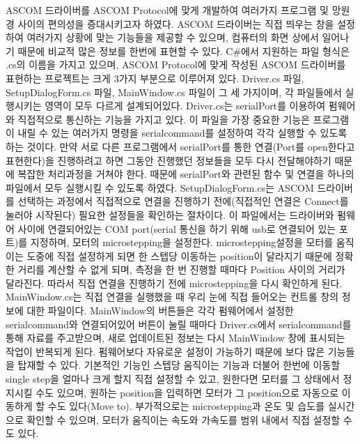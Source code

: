 ASCOM 드라이버를 ASCOM Protocol에 맞게 개발하여 여러가지 프로그램 및 망원경 사이의 편의성을 증대시키고자 하였다. ASCOM 드라이버는 직접 띄우는 창을 설정하여 여러가지 상황에 맞는 기능들을 제공할 수 있으며, 컴퓨터의 화면 상에서 일어나기 때문에 비교적 많은 정보를 한번에 표현할 수 있다.
C#에서 지원하는 파일 형식은 .cs의 이름을 가지고 있으며, ASCOM Protocol에 맞게 작성된 ASCOM 드라이버를 표현하는 프로젝트는 크게 3가지 부분으로 이루어져 있다. Driver.cs 파일, SetupDialogForm.cs 파일, MainWindow.cs 파일이 그 세 가지이며, 각 파일들에서 실행시키는 영역이 모두 다르게 설계되어있다.
Driver.cs는 serialPort를 이용하여 펌웨어와 직접적으로 통신하는 기능을 가지고 있다. 이 파일을 가장 중요한 기능은 프로그램이 내릴 수 있는 여러가지 명령을 serialcommand를 설정하여 각각 실행할 수 있도록 하는 것이다. 만약 서로 다른 프로그램에서 serialPort를 통한 연결(Port를 open한다고 표현한다)을 진행하려고 하면 그동안 진행했던 정보들을 모두 다시 전달해야하기 때문에 복잡한 처리과정을 거쳐야 한다. 때문에 serialPort와 관련된 함수 및 연결을 하나의 파일에서 모두 실행시킬 수 있도록 하였다.
SetupDialogForm.cs는 ASCOM 드라이버를 선택하는 과정에서 직접적으로 연결을 진행하기 전에(직접적인 연결은 Connect를 눌러야 시작된다) 필요한 설정들을 확인하는 절차이다. 이 파일에서는 드라이버와 펌웨어 사이에 연결되어있는 COM port(serial 통신을 하기 위해 usb로 연결되어 있는 포트)를 지정하며, 모터의 microstepping을 설정한다. microstepping설정을 모터를 움직이는 도중에 직접 설정하게 되면 한 스텝당 이동하는 position이 달라지기 때문에 정확한 거리를 계산할 수 없게 되며, 측정을 한 번 진행할 때마다 Position 사이의 거리가 달라진다. 따라서 직접 연결을 진행하기 전에 microstepping을 다시 확인하게 된다.
MainWindow.cs는 직접 연결을 실행했을 때 우리 눈에 직접 들어오는 컨트롤 창의 정보에 대한 파일이다. MainWindow의 버튼들은 각각 펌웨어에서 설정한 serialcommand와 연결되어있어 버튼이 눌릴 때마다 Driver.cs에서 serialcommand를 통해 자료를 주고받으며, 새로 업데이트된 정보는 다시 MainWindow 창에 표시되는 작업이 반복되게 된다. 
펌웨어보다 자유로운 설정이 가능하기 때문에 보다 많은 기능들을 탑재할 수 있다. 기본적인 기능인 스텝당 움직이는 기능과 더불어 한번에 이동할 single step을 얼마나 크게 할지 직접 설정할 수 있고, 원한다면 모터를 그 상태에서 정지시킬 수도 있으며, 원하는 position을 입력하면 모터가 그 position으로 자동으로 이동하게 할 수도 있다(Move to). 부가적으로는 microstepping과 온도 및 습도를 실시간으로 확인할 수 있으며, 모터가 움직이는 속도와 가속도를 범위 내에서 직접 설정할 수도 있다.